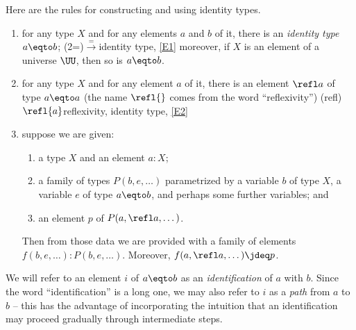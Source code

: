 Here are the rules for constructing and using identity types.
\begin{enumerate}[label=(E\arabic*),ref=(E\arabic*)]\label{rules-for-equality}
  \item\label{E1}
    for any type $X$ and for any elements $a$ and $b$ of it, there is an \emph{identity type} $a \eqto b$;%
    \glossary(2=){$\xrightarrow =$}{identity type, \cref{E1}}%
    moreover, if $X$ is an element of a universe $\UU$, then so is $a \eqto b$.
  \item\label{E2} for any type $X$ and for any element $a$ of it, there is an element $\refl a$ of type $a \eqto a$
    (the name $\refl{}$ comes from the word ``reflexivity'')%
    \glossary(refl){$\protect\refl{a}$}{reflexivity, identity type, \cref{E2}}
  \item\label{E3} suppose we are given:
    \begin{enumerate}
    \item a type $X$ and an element $a:X$;
    \item a family of types $P(b,e,\dots)$ parametrized by a variable $b$ of type $X$, a variable $e$ of type $a \eqto b$, and perhaps some
      further variables; and
    \item an element $p$ of $P(a,\refl a,\dots)$.
    \end{enumerate}
    Then from those data we are provided with a family of elements $f(b,e,\dots) : P(b,e,\dots)$.
    Moreover, $f(a,\refl a,\dots) \jdeq p$.
\end{enumerate}

We will refer to an element $i$ of $a \eqto b$ as an
\emph{identification} of $a$ with $b$.
Since the word ``identification'' is a long one,
we may also refer to $i$ as a \emph{path} from $a$ to
$b$ -- this has the advantage of incorporating the intuition that an identification may proceed gradually through intermediate steps.%

